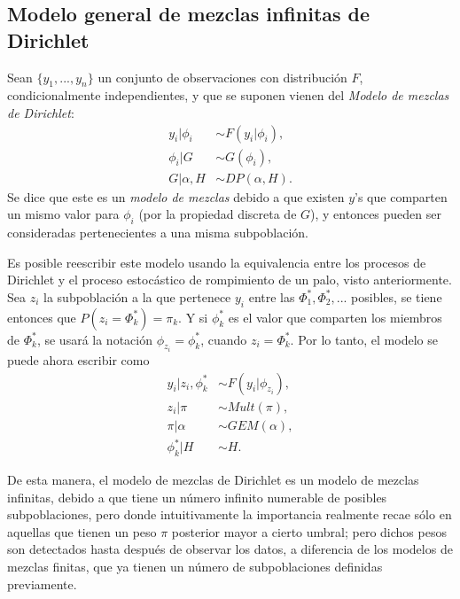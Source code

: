 \subsection{Modelo general de mezclas infinitas de Dirichlet}

Sean $\{y_1,...,y_n\}$ un conjunto de observaciones con distribuci\'on $F$, condicionalmente independientes, y que se suponen vienen del \textit{Modelo de mezclas de Dirichlet}:
\begin{equation*}
\begin{aligned}
   y_i | \phi_i &\sim F(y_i | \phi_i), \\
   \phi_i | G &\sim G(\phi_i), \\
   G | \alpha, H &\sim DP(\alpha,H).
\end{aligned}
\end{equation*}
Se dice que este es un \textit{modelo de mezclas} debido a que existen $y$'s que comparten un mismo valor para $\phi_i$ (por la propiedad discreta de $G$), y entonces pueden ser consideradas pertenecientes a una misma subpoblaci\'on.

Es posible reescribir este modelo usando la equivalencia entre los procesos de Dirichlet y el proceso estoc\'astico de rompimiento de un palo, visto anteriormente. Sea $z_i$ la subpoblaci\'on a la que pertenece $y_i$ entre las $\Phi_1^*,\Phi_2^*,...$ posibles, se tiene entonces que $P(z_i = \Phi_k^*) = \pi_k$. Y si $\phi_k^*$ es el valor que comparten los miembros de $\Phi_k^*$, se usar\'a la notaci\'on $\phi_{z_i} = \phi_k^*$, cuando $z_i = \Phi_k^*$. Por lo tanto, el modelo se puede ahora escribir como
\begin{equation*}
\begin{aligned}
   y_i | z_i, \phi_k^* &\sim F(y_i | \phi_{z_i}), \\
   z_i | \pi &\sim Mult(\pi), \\
   \pi | \alpha &\sim GEM(\alpha), \\
   \phi_k^* | H &\sim H.
\end{aligned}
\end{equation*}

De esta manera, el modelo de mezclas de Dirichlet es un modelo de mezclas infinitas, debido a que tiene un n\'umero infinito numerable de posibles subpoblaciones, pero donde intuitivamente la importancia realmente recae s\'olo en aquellas que tienen un peso $\pi$ posterior mayor a cierto umbral; pero dichos pesos son detectados hasta despu\'es de observar los datos, a diferencia de los modelos de mezclas finitas, que ya tienen un n\'umero de subpoblaciones definidas previamente.

